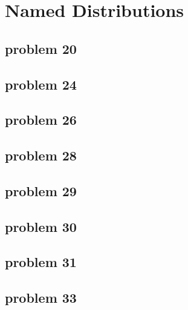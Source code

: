 \section{Named Distributions}

\subsection{problem 20}


\subsection{problem 24}


\subsection{problem 26}


\subsection{problem 28}


\subsection{problem 29}


\subsection{problem 30}


\subsection{problem 31}


\subsection{problem 33}
